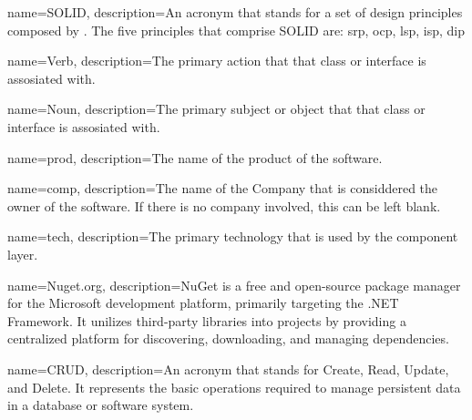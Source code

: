 
{ name=SOLID, description={An acronym that stands for a set of design principles
    composed by . The five
    principles that comprise SOLID are: \acrlong*{srp}, \acrlong*{ocp}, \acrlong*{lsp},
    \acrlong*{isp}, \acrlong*{dip}} }

{
    name=Verb,
    description={The primary action that that class or interface is assosiated with.}
}

{
    name=Noun,
    description={The primary subject or object that that class or interface is assosiated with.}
}

{
    name=prod,
    description={The name of the product of the software.}
}

{
    name=comp,
    description={The name of the Company that is considdered the owner of the software. If
    there is no company involved, this can be left blank.}
}

{
    name=tech,
    description={The primary technology that is used by the component layer.}
}

{ name=Nuget.org, description={NuGet is a free and open-source package manager for the
    Microsoft development platform, primarily targeting the .NET Framework. It unilizes
    third-party libraries into projects by providing a centralized platform for
    discovering, downloading, and managing dependencies.} }

{ name=CRUD, description={An acronym that stands for Create, Read, Update, and Delete. It
represents the basic operations required to manage persistent data in a database or
software system.} }